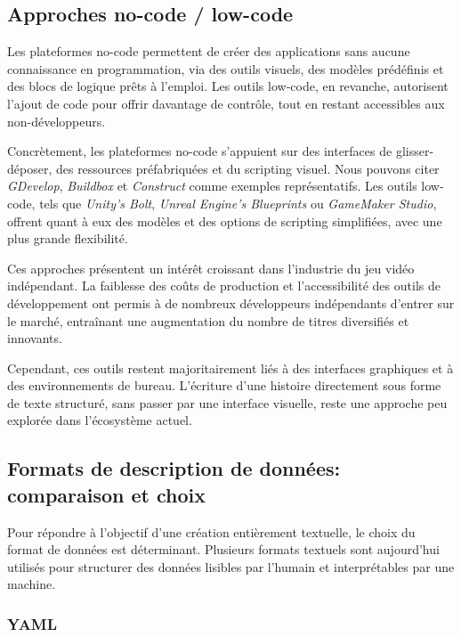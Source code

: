 \subsection{Approches no-code / low-code}

Les plateformes no-code permettent de créer des applications sans aucune connaissance en programmation, via des outils visuels, des modèles prédéfinis et des blocs de logique prêts à l'emploi. Les outils low-code, en revanche, autorisent l'ajout de code pour offrir davantage de contrôle, tout en restant accessibles aux non-développeurs.

Concrètement, les plateformes no-code s'appuient sur des interfaces de glisser-déposer, des ressources préfabriquées et du scripting visuel. Nous pouvons citer \textit{GDevelop}, \textit{Buildbox} et \textit{Construct} comme exemples représentatifs. Les outils low-code, tels que \textit{Unity's Bolt}, \textit{Unreal Engine's Blueprints} ou \textit{GameMaker Studio}, offrent quant à eux des modèles et des options de scripting simplifiées, avec une plus grande flexibilité. \parencite{labs_rise_2024}

Ces approches présentent un intérêt croissant dans l'industrie du jeu vidéo indépendant. La faiblesse des coûts de production et l'accessibilité des outils de développement ont permis à de nombreux développeurs indépendants d'entrer sur le marché, entraînant une augmentation du nombre de titres diversifiés et innovants. \parencite{noauthor_visual_nodate}

Cependant, ces outils restent majoritairement liés à des interfaces graphiques et à des environnements de bureau. L'écriture d'une histoire directement sous forme de texte structuré, sans passer par une interface visuelle, reste une approche peu explorée dans l'écosystème actuel.



\subsection{Formats de description de données: comparaison et choix}

Pour répondre à l'objectif d'une création entièrement textuelle, le choix du format de données est déterminant. Plusieurs formats textuels sont aujourd'hui utilisés pour structurer des données lisibles par l'humain et interprétables par une machine.


\subsubsection{YAML}

